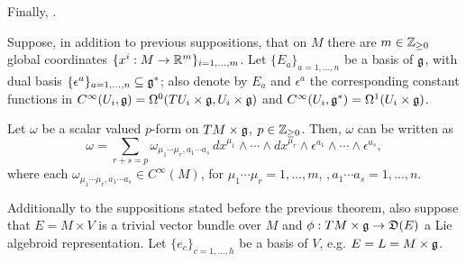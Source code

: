 \begin{theorem}
Finally, .
\end{theorem}

\linea

Suppose, in addition to previous suppositions, that on $M$ there are $m \in \mathbb{Z}_{\geq 0}$ global coordinates $\{x^i: M \to \mathbb{R}^m\}_{i = 1, \dots, m}$. Let $\{E_a\}_{a = 1, \dots, n}$ be a basis of $\mathfrak{g}$, with dual basis $\{\epsilon^a\}_{a = 1, \dots, n} \subset \alg g^*$; also denote by $E_a$ and $\epsilon^a$ the corresponding constant functions in $C^\infty(U_i, \mathfrak{g}) = \Omega^0(TU_i \times \mathfrak{g}, U_i \times \mathfrak{g})$ and $C^\infty(U_i, \mathfrak{g}^*) = \Omega^1(U_i \times \mathfrak{g})$.

\begin{theorem}\label{TheoremDecompOfScalarValuedFormsTLA}
Let $\omega$ be a scalar valued $p$-form on $TM \times \mathfrak{g}$, $p \in \mathbb{Z}_{\geq 0}$. Then, $\omega$ can be written as
\begin{equation}
    \omega = \sum_{r + s = p} \omega_{\mu_1 \cdots \mu_r, a_1 \cdots a_s}\, dx^{\mu_1} \wedge \cdots \wedge dx^{\mu_r} \wedge \epsilon^{a_1} \wedge \cdots \wedge \epsilon^{a_s},
\end{equation}
where each $\omega_{\mu_1 \cdots \mu_r, a_1 \cdots a_s} \in C^\infty(M)$, for $\mu_1 \cdots \mu_r = 1, \dots, m$, $, a_1 \cdots a_s = 1, \dots, n$.
\end{theorem}

\lin

Additionally to the suppositions stated before the previous theorem, also suppose that $E = M \times V$ is a trivial vector bundle over $M$ and $\phi: TM \times \alg g \to \alg D(E)$ a Lie algebroid representation. Let $\{e_c\}_{c = 1, \dots, h}$ be a basis of $V$, e.g. $E = L = M \times \mathfrak{g}$.


